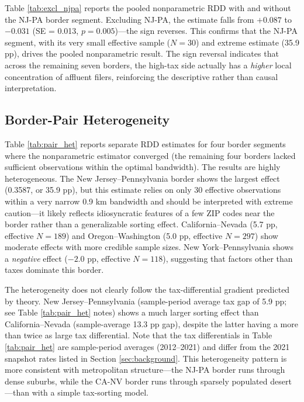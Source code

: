 \documentclass[12pt]{article}
\begin{document}
Table \ref{tab:excl_njpa} reports the pooled nonparametric RDD with and without the NJ-PA border segment. Excluding NJ-PA, the estimate falls from $+0.087$ to $-0.031$ (SE = 0.013, $p = 0.005$)---the sign reverses. This confirms that the NJ-PA segment, with its very small effective sample ($N = 30$) and extreme estimate (35.9 pp), drives the pooled nonparametric result. The sign reversal indicates that across the remaining seven borders, the high-tax side actually has a \textit{higher} local concentration of affluent filers, reinforcing the descriptive rather than causal interpretation.

\subsection{Border-Pair Heterogeneity}



Table \ref{tab:pair_het} reports separate RDD estimates for four border segments where the nonparametric estimator converged (the remaining four borders lacked sufficient observations within the optimal bandwidth). The results are highly heterogeneous. The New Jersey--Pennsylvania border shows the largest effect (0.3587, or 35.9 pp), but this estimate relies on only 30 effective observations within a very narrow 0.9 km bandwidth and should be interpreted with extreme caution---it likely reflects idiosyncratic features of a few ZIP codes near the border rather than a generalizable sorting effect. California--Nevada (5.7 pp, effective $N = 189$) and Oregon--Washington (5.0 pp, effective $N = 297$) show moderate effects with more credible sample sizes. New York--Pennsylvania shows a \textit{negative} effect ($-2.0$ pp, effective $N = 118$), suggesting that factors other than taxes dominate this border.

The heterogeneity does not clearly follow the tax-differential gradient predicted by theory. New Jersey--Pennsylvania (sample-period average tax gap of 5.9 pp; see Table \ref{tab:pair_het} notes) shows a much larger sorting effect than California--Nevada (sample-average 13.3 pp gap), despite the latter having a more than twice as large tax differential. Note that the tax differentials in Table \ref{tab:pair_het} are sample-period averages (2012--2021) and differ from the 2021 snapshot rates listed in Section \ref{sec:background}. This heterogeneity pattern is more consistent with metropolitan structure---the NJ-PA border runs through dense suburbs, while the CA-NV border runs through sparsely populated desert---than with a simple tax-sorting model.
\end{document}
